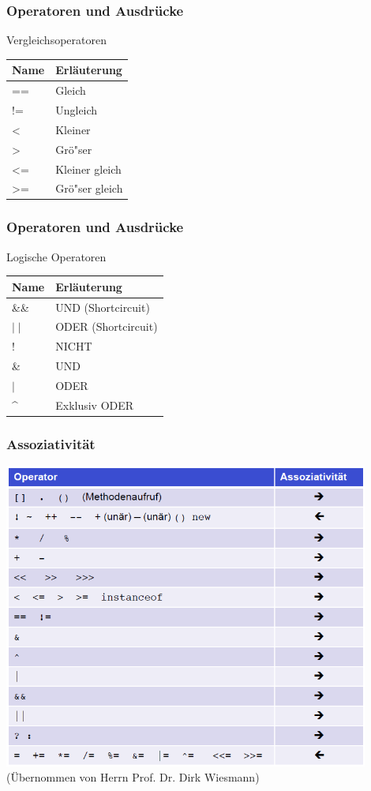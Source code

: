 \begin{frame}[fragile]
	\frametitle{Operatoren und Ausdr\"ucke}
	Vergleichsoperatoren
	\begin{table}
		\begin{tabular}{l|l}
			Name & Erl\"auterung  \\ \hline
			== & Gleich \\
			!= & Ungleich \\
			\textless & Kleiner \\
			\textgreater & Gr\"o"ser \\
			\textless= & Kleiner gleich \\
			\textgreater= & Gr\"o"ser gleich \\
		\end{tabular}
	\end{table}
\end{frame}

\begin{frame}[fragile]
	\frametitle{Operatoren und Ausdr\"ucke}
	Logische Operatoren
	\begin{table}
		\begin{tabular}{l|l}
			Name & Erl\"auterung  \\ \hline
			\&\&  & UND (Shortcircuit) \\
			$\mid\mid$ & ODER (Shortcircuit) \\
			! & NICHT \\
			\& & UND \\
			$\mid$ & ODER \\
			\textasciicircum & Exklusiv ODER \\
		\end{tabular}
	\end{table}
\end{frame}

\begin{frame}[fragile]
	\frametitle{Assoziativität}
	\center
	\includegraphics[width=0.9\textwidth,
	keepaspectratio=true]{bilder/assoz.png}\\
	\tiny (Übernommen von Herrn Prof. Dr. Dirk Wiesmann)
\end{frame}

